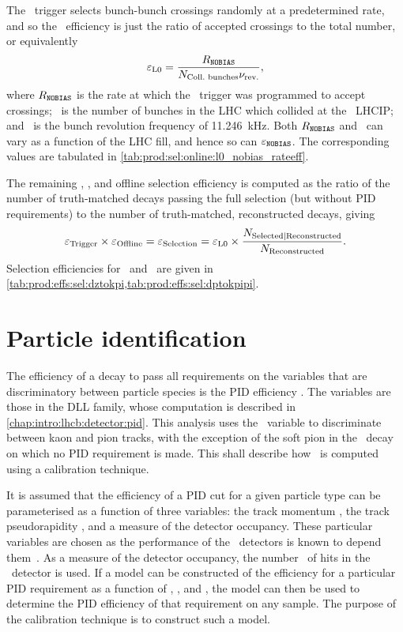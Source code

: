 The \lzero\ trigger selects bunch-bunch crossings randomly at a predetermined 
rate, and so the \lzero\ efficiency is just the ratio of accepted crossings to 
the total number, or equivalently
\begin{equation}
  \efflzero = \frac{%
    R_{\nobias}
  }{%
    \ncollbunches\revfreq
  },
  \label{eqn:prod:effs:sel:l0}
\end{equation}
where $R_{\texttt{NOBIAS}}$ is the rate at which the \lzero\ trigger was programmed to 
accept crossings; \ncollbunches\ is the number of bunches in the \ac{LHC} which 
collided at the \lhcb\ \acl{LHCIP}; and \revfreq\ is the bunch revolution 
frequency of \SI{11.246}{\kilo\hertz}.
Both $R_{\texttt{NOBIAS}}$ and \ncollbunches\ can vary as a function of the \ac{LHC} 
fill, and hence so can $\varepsilon_{\texttt{NOBIAS}}$.
The corresponding values are tabulated in 
\cref{tab:prod:sel:online:l0_nobias_rateeff}.

The remaining \hltone, \hlttwo, and offline selection efficiency is computed as 
the ratio of the number of truth-matched decays passing the full selection (but 
without \ac{PID} requirements) to the number of truth-matched, reconstructed 
decays, giving
\begin{equation}
  \efftrig \times \effoffline = \effselection = \efflzero \times \frac{%
    N_{\text{Selected}|\text{Reconstructed}}
  }{%
    N_{\text{Reconstructed}}
  }.
  \label{eqn:prod:effs:sel}
\end{equation}
Selection efficiencies for \DzToKpi\ and \DpToKpipi\ are given in 
\cref{tab:prod:effs:sel:dztokpi,tab:prod:effs:sel:dptokpipi}.

\section{Particle identification}
\label{chap:prod:effs:pid}

The efficiency of a decay to pass all requirements on the variables that are 
discriminatory between particle species is the \ac{PID} efficiency \effpid.
The variables are those in the \acf{DLL} family, whose computation is described 
in \cref{chap:intro:lhcb:detector:pid}.
This analysis uses the \dllkpi\ variable to discriminate between kaon and pion 
tracks, with the exception of the soft pion in the \DstToDzpi\ decay on which 
no \ac{PID} requirement is made.
This  shall describe how \effpid\ is computed 
using a calibration technique.

It is assumed that the efficiency of a \ac{PID} cut for a given particle type 
can be parameterised as a function of three variables: the track momentum 
\ptot, the track pseudorapidity \Eta, and a measure of the detector occupancy.
These particular variables are chosen as the performance of the \rich\ 
detectors is known to depend them~\cite{Adinolfi:2012qfa}.
As a measure of the detector occupancy, the number \nspd\ of hits in the \spd\ 
detector is used.
If a model can be constructed of the efficiency for a particular \ac{PID} 
requirement as a function of \ptot, \Eta, and \nspd, the model can then be used 
to determine the \ac{PID} efficiency of that requirement on any sample.
The purpose of the calibration technique is to construct such a model.


